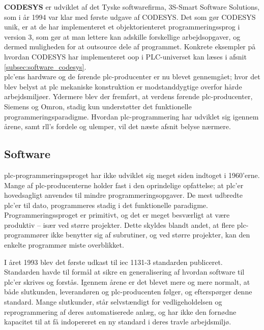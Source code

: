 \label{subsec:codesys}
\noindent\textbf{CODESYS} er udviklet af det Tyske softwarefirma, 3S-Smart Software Solutions, som i år 1994 var klar med første udgave af CODESYS. Det som gør CODESYS unik, er at de har implementeret et objektorienteret programmeringssprog i version 3, som gør at man lettere kan adskille forskellige arbejdsopgaver, og dermed muligheden for at outsource dele af programmet. Konkrete eksempler på hvordan CODESYS har implementeret \gls{oop} i PLC-universet kan læses i afsnit \ref{subsec:software_codesys}. \\

\noindent \gls{plc}'ens hardware og de førende \gls{plc}-producenter er nu blevet gennemgået; hvor det blev belyst at \gls{plc} mekaniske konstruktion er modstanddygtige overfor hårde arbejdsmiljøer. Ydermere blev der fremført, at verdens førende \gls{plc}-producenter, Siemens og Omron, stadig kun understøtter det funktionelle programmeringsparadigme. 
Hvordan \gls{plc}-programmering har udviklet sig igennem årene, samt \gls{rll}'s fordele og ulemper, vil det næste afsnit belyse nærmere.

\subsection{Software}
\gls{plc}-programmeringssproget har ikke udviklet sig meget siden indtoget i 1960’erne. 
Mange af \gls{plc}-producenterne holder fast i den oprindelige opfattelse; at \gls{plc}’er hovedsagligt anvendes til mindre programmeringsopgaver. De mest udbredte \gls{plc}’er til dato, programmeres stadig i det funktionelle paradigme. Programmeringssproget er primitivt, og det er meget besværligt at være produktiv – især ved større projekter. Dette skyldes blandt andet, at flere \gls{plc}-programmører ikke benytter sig af subrutiner, og ved større projekter, kan den enkelte programmør miste overblikket. 

I året 1993 blev det første udkast til \gls{iec} 1131-3 standarden publiceret\cite{iecStandard}. Standarden havde til formål at sikre en generalisering af hvordan software til \gls{plc}'er skrives og forstås. Igennem årene er det blevet mere og mere normalt, at både slutkunden, leverandøren og \gls{plc}-producenten følger, og efterspørger denne standard. Mange slutkunder, står selvstændigt for vedligeholdelsen og reprogrammering af deres automatiserede anlæg, og har ikke den fornødne kapacitet til at få indopereret en ny standard i deres travle arbejdsmiljø. \\

